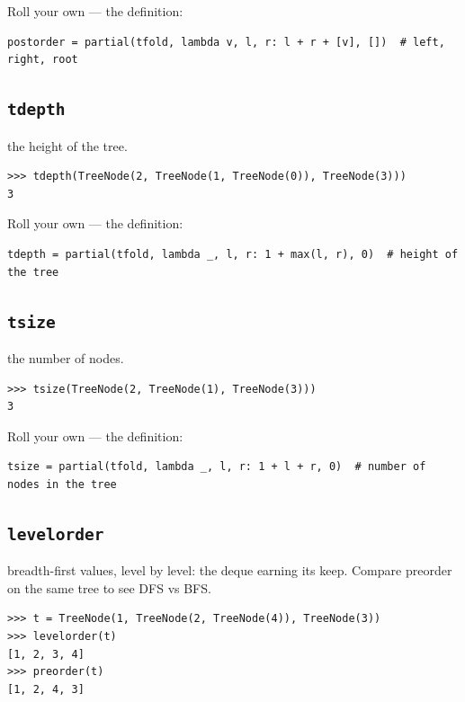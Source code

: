 \documentclass[10pt,letterpaper]{book}
\begin{document}
Roll your own --- the definition:

\begin{lstlisting}[style=ex]
postorder = partial(tfold, lambda v, l, r: l + r + [v], [])  # left, right, root
\end{lstlisting}

\subsection{\texttt{tdepth}}\label{def:tdepth}
the height of the tree.
\begin{lstlisting}[style=ex]
>>> tdepth(TreeNode(2, TreeNode(1, TreeNode(0)), TreeNode(3)))
3
\end{lstlisting}

Roll your own --- the definition:

\begin{lstlisting}[style=ex]
tdepth = partial(tfold, lambda _, l, r: 1 + max(l, r), 0)  # height of the tree
\end{lstlisting}

\subsection{\texttt{tsize}}\label{def:tsize}
the number of nodes.
\begin{lstlisting}[style=ex]
>>> tsize(TreeNode(2, TreeNode(1), TreeNode(3)))
3
\end{lstlisting}

Roll your own --- the definition:

\begin{lstlisting}[style=ex]
tsize = partial(tfold, lambda _, l, r: 1 + l + r, 0)  # number of nodes in the tree
\end{lstlisting}

\subsection{\texttt{levelorder}}\label{def:levelorder}
breadth-first values, level by level: the deque earning its keep. Compare preorder on the same tree to see DFS vs BFS.
\begin{lstlisting}[style=ex]
>>> t = TreeNode(1, TreeNode(2, TreeNode(4)), TreeNode(3))
>>> levelorder(t)
[1, 2, 3, 4]
>>> preorder(t)
[1, 2, 4, 3]
\end{lstlisting}
\end{document}
